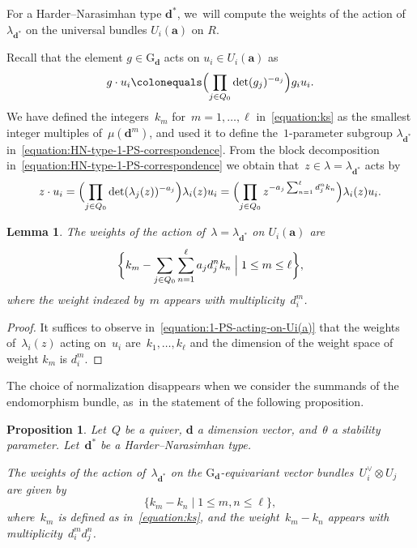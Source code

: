 \documentclass[11pt]{article}
\theoremstyle{plain}
\newtheorem{lemma}[theorem]{Lemma}
\newtheorem{proposition}[theorem]{Proposition}
\theoremstyle{definition}
\newcommand\group[1][\tuple{d}]{\mathrm{G}_{#1}}
\newcommand\tuple[1]{\ensuremath{{\boldsymbol{#1}}}}
\begin{document}
For a Harder--Narasimhan type $\tuple{d}^*$, we~will compute the weights of the action of $\lambda_{\tuple{d}^*}$
on the universal bundles $U_i(\tuple{a})$ on $R$.

Recall that the element $g \in {\group}$ acts on $u_i \in U_i(\tuple{a})$ as
\begin{equation*}
g \cdot u_i \colonequals \Bigl(\prod_{j \in Q_0} \det(g_j)^{-a_j} \Bigr) g_i u_i.
\end{equation*}
We have defined the integers~$k_m$ for~$m=1,\ldots,\ell$ in~\eqref{equation:ks}
as the smallest integer multiples of~$\mu(\tuple{d}^m)$,
and used it to define the~$1$-parameter subgroup $\lambda_{\tuple{d}^*}$ in~\eqref{equation:HN-type-1-PS-correspondence}.
From the block decomposition in~\eqref{equation:HN-type-1-PS-correspondence}
we obtain that~$z\in\lambda=\lambda_{\tuple{d}^*}$ acts by
\begin{equation}
\label{equation:1-PS-acting-on-Ui(a)}
z \cdot u_i
= \Bigl(\prod_{j\in Q_0}\det(\lambda_j(z))^{-a_j}\Bigr)\lambda_i(z)u_i
= \Bigl(\prod_{j\in Q_0} z^{-a_j\sum_{n=1}^\ell d^n_j k_n}\Bigr) \lambda_i(z) u_i.
\end{equation}

\begin{lemma}
The weights of the action of~$\lambda=\lambda_{\tuple{d}^*}$
on $U_i(\tuple{a})$ are
\begin{equation}
\label{equation:weights-Ui(a)}
\biggl\{ k_m - \sum_{j \in Q_0} \sum_{n=1}^\ell a_j d^n_j k_n \Bigm| 1\leq m \leq \ell \biggr\},
\end{equation}
where the weight indexed by~$m$ appears with multiplicity~$d_i^m$.
\end{lemma}

\begin{proof}
It suffices to observe in~\eqref{equation:1-PS-acting-on-Ui(a)}
that the weights of~$\lambda_i(z)$ acting on~$u_i$ are~$k_1,\ldots,k_\ell$ and the dimension of the weight space of weight $k_m$ is $d_i^m$.
\end{proof}

The choice of normalization disappears when we consider the summands of the endomorphism bundle, as~in the statement of the following proposition.

\begin{proposition}
\label{proposition:weights-endomorphism-summands}
Let~$Q$ be a quiver,
$\tuple{d}$ a dimension vector,
and~$\theta$ a stability parameter.
Let~$\tuple{d}^*$ be a Harder--Narasimhan type.

The weights of the action of~$\lambda_{\tuple{d}^*}$
on the $\group$-equivariant vector bundles~$U_i^\vee\otimes U_j$
are given by
\begin{equation*}
\{ k_m - k_n\mid 1 \leq m,n \leq \ell \},
\end{equation*}
where~$k_m$ is defined as in~\eqref{equation:ks},
and the weight~$k_m-k_n$ appears with multiplicity~$d_i^md_j^n$.
\end{proposition}
\end{document}
